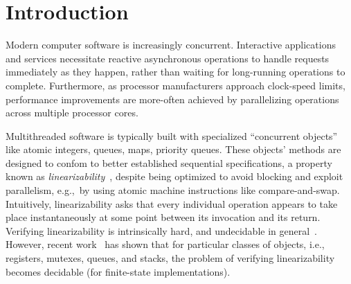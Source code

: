 \section{Introduction}
\label{sec:introduction}


Modern computer software is increasingly concurrent. Interactive applications
and services necessitate reactive asynchronous operations to handle requests
immediately as they happen, rather than waiting for long-running operations to
complete. Furthermore, as processor manufacturers approach clock-speed limits,
performance improvements are more-often achieved by parallelizing operations
across multiple processor cores.




 Multithreaded software is typically built with specialized “concurrent
  objects” like atomic integers, queues, maps, priority queues. These objects’ methods are
  designed to confom to better established sequential specifications, a property known as \emph{linearizability}~\cite{journals/toplas/HerlihyW90},
  despite being optimized to avoid blocking and exploit parallelism, e.g.,~by
  using atomic machine instructions like compare-and-swap. Intuitively, linearizability asks that every individual operation appears to take place instantaneously at some point between its invocation and its return. Verifying linearizability is intrinsically hard, and undecidable in general~\cite{conf/esop/BouajjaniEEH13}. %
However, recent work~\cite{DBLP:conf/icalp/BouajjaniEEH15} has shown that for particular classes of objects,
i.e., registers, mutexes, queues, and stacks, the problem of verifying linearizability becomes decidable (for finite-state implementations).

